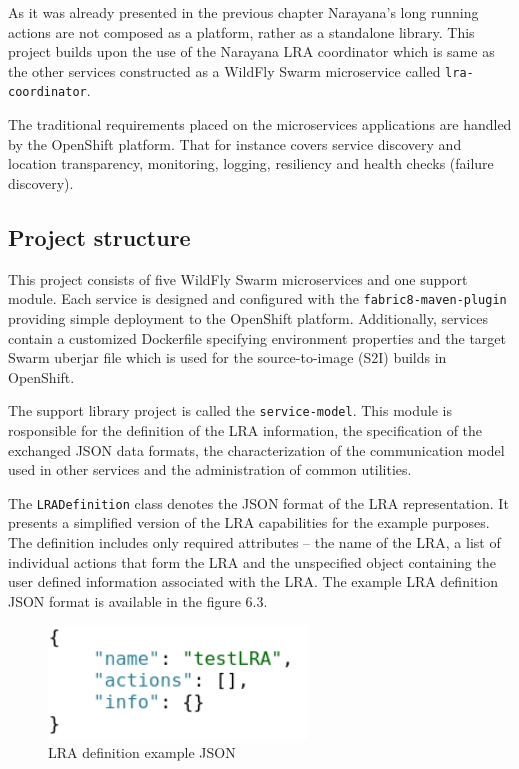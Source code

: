 \documentclass[oneside,
  digital, %
  table,   %
  nolof,     %
  nolot,     %
]{fithesis3}
\begin{document}
As it was already presented in the previous chapter Narayana's long running actions are not composed as a platform, rather as a standalone library. This project builds upon the use of the Narayana LRA coordinator which is same as the other services constructed as a WildFly Swarm microservice called \texttt{lra-coordinator}. 

The traditional requirements placed on the microservices applications are handled by the OpenShift platform. That for instance covers service discovery and location transparency, monitoring, logging, resiliency and health checks (failure discovery). 


\subsection{Project structure}

This project consists of five WildFly Swarm microservices and one support module. Each service is designed and configured with the \texttt{fabric8-maven-plugin} providing simple deployment to the OpenShift platform. Additionally, services contain a customized Dockerfile specifying environment properties and the target Swarm uberjar file which is used for the source-to-image (S2I) builds in OpenShift.

The support library project is called the \texttt{service-model}. This module is rosponsible for the definition of the LRA information, the specification of the exchanged JSON data formats, the characterization of the communication model used in other services and the administration of common utilities.

The \texttt{LRADefinition} class denotes the JSON format of the LRA representation. It presents a simplified version of the LRA capabilities for the example purposes. The definition includes only required attributes -- the name of the LRA, a list of individual actions that form the LRA and the unspecified object containing the user defined information associated with the LRA. The example LRA definition JSON format is available in the figure 6.3.

\begin{figure}
    \begin{center}
        \includegraphics[height=30mm]{images/LRADefinition.png}
    \end{center}
    \caption{LRA definition example JSON}
\end{figure}
\end{document}
